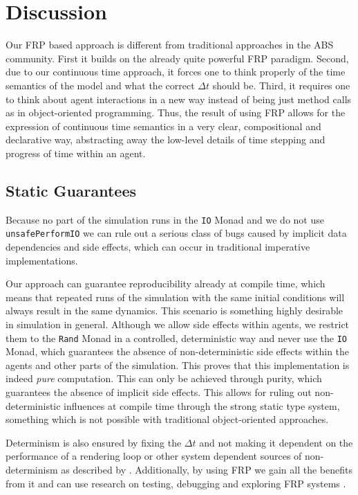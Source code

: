 \section{Discussion}
Our FRP based approach is different from traditional approaches in the ABS community. First it builds on the already quite powerful FRP paradigm. Second, due to our continuous time approach, it forces one to think properly of the time semantics of the model and what the correct $\Delta t$ should be. Third, it requires one to think about agent interactions in a new way instead of being just method calls as in object-oriented programming. Thus, the result of using FRP allows for the expression of continuous time semantics in a very clear, compositional and declarative way, abstracting away the low-level details of time stepping and progress of time within an agent.

\subsection{Static Guarantees}
Because no part of the simulation runs in the \texttt{IO} Monad and we do not use \texttt{unsafePerformIO} we can rule out a serious class of bugs caused by implicit data dependencies and side effects, which can occur in traditional imperative implementations.

Our approach can guarantee reproducibility already at compile time, which means that repeated runs of the simulation with the same initial conditions will always result in the same dynamics. This scenario is something highly desirable in simulation in general. Although we allow side effects within agents, we restrict them to the \texttt{Rand} Monad in a controlled, deterministic way and never use the \texttt{IO} Monad, which guarantees the absence of non-deterministic side effects within the agents and other parts of the simulation. This proves that this implementation is indeed \textit{pure} computation. This can only be achieved through purity, which guarantees the absence of implicit side effects. This allows for ruling out non-deterministic influences at compile time through the strong static type system, something which is not possible with traditional object-oriented approaches.

Determinism is also ensured by fixing the $\Delta t$ and not making it dependent on the performance of a rendering loop or other system dependent sources of non-determinism as described by \cite{perez_testing_2017}. Additionally, by using FRP we gain all the benefits from it and can use research on testing, debugging and exploring FRP systems \cite{perez_back_2017,perez_testing_2017}.

